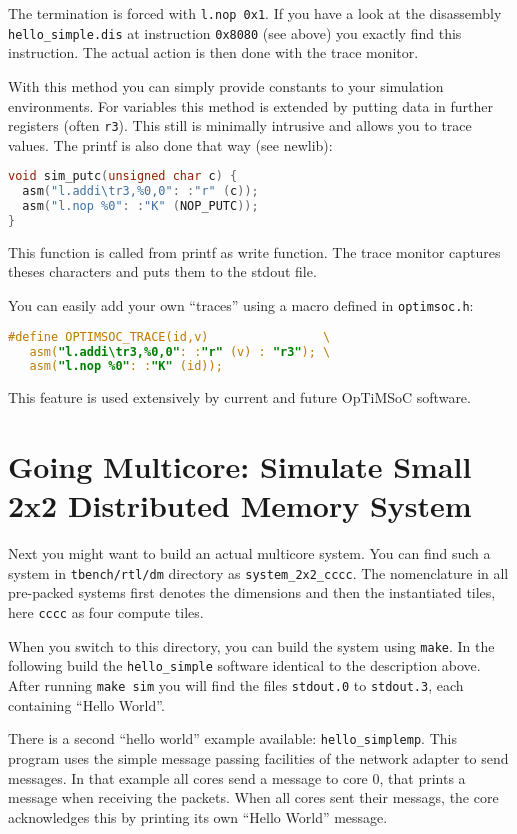 The termination is forced with \verb|l.nop 0x1|. If you have a look at
the disassembly \verb|hello_simple.dis| at instruction \verb|0x8080|
(see above) you exactly find this instruction. The actual action is
then done with the trace monitor.

With this method you can simply provide constants to your simulation
environments. For variables this method is extended by putting data in
further registers (often \verb|r3|). This still is minimally intrusive
and allows you to trace values. The printf is also done that way (see
newlib):

\begin{lstlisting}[language=C]
void sim_putc(unsigned char c) {
  asm("l.addi\tr3,%0,0": :"r" (c));
  asm("l.nop %0": :"K" (NOP_PUTC));
}
\end{lstlisting}

This function is called from printf as write function. The trace
monitor captures theses characters and puts them to the stdout file.

You can easily add your own ``traces'' using a macro defined in
\verb|optimsoc.h|:

\begin{lstlisting}[language=C]
#define OPTIMSOC_TRACE(id,v)                \
   asm("l.addi\tr3,%0,0": :"r" (v) : "r3"); \
   asm("l.nop %0": :"K" (id));
\end{lstlisting}

This feature is used extensively by current and future OpTiMSoC software.

\section{Going Multicore: Simulate Small 2x2 Distributed Memory
  System}

Next you might want to build an actual multicore system. You can find
such a system in \verb|tbench/rtl/dm| directory as
\verb|system_2x2_cccc|. The nomenclature in all pre-packed systems
first denotes the dimensions and then the instantiated tiles, here
\verb|cccc| as four compute tiles.

When you switch to this directory, you can build the system using
\verb|make|. In the following build the \verb|hello_simple| software
identical to the description above. After running \verb|make sim| you
will find the files \verb|stdout.0| to \verb|stdout.3|, each
containing ``Hello World''.

There is a second ``hello world'' example available:
\verb|hello_simplemp|. This program uses the simple message passing
facilities of the network adapter to send messages. In that example
all cores send a message to core 0, that prints a message when
receiving the packets. When all cores sent their messags, the core
acknowledges this by printing its own ``Hello World'' message.

